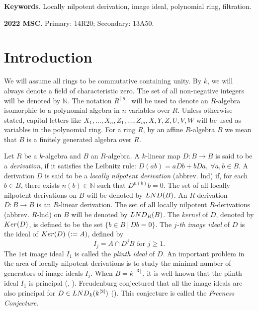 \documentclass[a4paper,12pt]{article}
\newcommand{\bN}{\mathbb N}
\begin{document}
\smallskip
\noindent
{\small {{\bf Keywords}. Locally nilpotent derivation, image ideal, polynomial ring, filtration.}
	
	\smallskip
	\noindent
	{\small {{\bf 2022 MSC}. Primary: 14R20; Secondary: 13A50.}}
	
	
	
	\section{Introduction}
	We will assume all rings to be commutative containing unity. By $k$, we will always denote a field of characteristic zero. The set of all non-negative integers will be denoted by $\bN$. The notation  $R^{[n]}$ will be used to denote an $R$-algebra isomorphic to a polynomial algebra in $n$ variables over $R$. Unless otherwise stated, capital letters like $X_1,\dots,X_n,Z_1,\dots,Z_m,X,Y,Z,U,V,W$ will be used as variables in the polynomial ring. For a ring $R$, by an affine $R$-algebra $B$ we mean that $B$ is a finitely generated algebra over $R$. 
	
	\smallskip
	\noindent
	Let $R$ be a $k$-algebra and $B$ an $R$-algebra. A $k$-linear map $D:B\longrightarrow B$ is said to be a {\it derivation}, if it satisfies the Leibnitz rule: $D(ab)=aDb+bDa,~\forall a,b \in B$. A derivation $D$ is said to be a {\it locally nilpotent derivation} (abbrev. lnd) if, for each $b\in{B}$, there exists $n(b)\in{\bN}$ such that $D^{n(b)}b=0$. The set of all locally nilpotent derivations on $B$ will be denoted by ${\rm LND}(B)$. An $R$-derivation $D:B\longrightarrow B$ is an $R$-linear derivation. The set of all locally nilpotent $R$-derivations (abbrev. $R$-lnd) on $B$ will be denoted by ${\rm LND}_R(B)$. The {\it kernel} of $D$, denoted by ${\rm Ker}(D)$, is defined to be the set $\{b \in B~\vert~Db=0\}$.
	The {\it $j$-th image ideal} of $D$ is the ideal of ${\rm Ker}(D)~(:=A)$, defined by 
	$$ I_j=A \cap D^{j}B\text{ for } j\geqslant 1.$$
	The $1$st image ideal $I_1$ is called the {\it plinth ideal} of $D$. An important problem in the area of locally nilpotent derivations is to study the minimal number of generators of image ideals $I_j$. When $B=k^{[3]}$, it is well-known that the plinth ideal $I_1$ is principal (\cite[Theorem 5.12]{F}, \cite[Theorem 1]{DK}). Freudenburg conjectured that all the image ideals are also principal for $D \in {\rm LND}_k(k^{[3]})$ (\cite[11.2]{F}). This conjecture is called the {\it Freeness Conjecture}.
	
	
}
\end{document}
